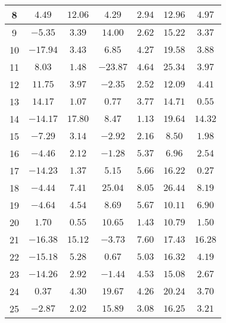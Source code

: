 \begin{table}[H]
\begin{tabular}{|c|c|c|c|c|c|c|}
                        8    &  $4.49$     &  $12.06$  &  $4.29$    &  $2.94$  &  $12.96$ &  $4.97$   \\ \hline
                        9    &  $-5.35$    &  $3.39$   &  $14.00$   &  $2.62$  &  $15.22$ &  $3.37$   \\ \hline
                        10   &  $-17.94$   &  $3.43$   &  $6.85$    &  $4.27$  &  $19.58$ &  $3.88$   \\ \hline
                        11   &  $8.03$     &  $1.48$   &  $-23.87$  &  $4.64$  &  $25.34$ &  $3.97$   \\ \hline
                        12   &  $11.75$    &  $3.97$   &  $-2.35$   &  $2.52$  &  $12.09$ &  $4.41$   \\ \hline
                        13   &  $14.17$    &  $1.07$   &  $0.77$    &  $3.77$  &  $14.71$ &  $0.55$   \\ \hline
                        14   &  $-14.17$   &  $17.80$  &  $8.47$    &  $1.13$  &  $19.64$ &  $14.32$  \\ \hline
                        15   &  $-7.29$    &  $3.14$   &  $-2.92$   &  $2.16$  &  $8.50$  &  $1.98$   \\ \hline
                        16   &  $-4.46$    &  $2.12$   &  $-1.28$   &  $5.37$  &  $6.96$  &  $2.54$   \\ \hline
                        17   &  $-14.23$   &  $1.37$   &  $5.15$    &  $5.66$  &  $16.22$ &  $0.27$   \\ \hline
                        18   &  $-4.44$    &  $7.41$   &  $25.04$   &  $8.05$  &  $26.44$ &  $8.19$   \\ \hline
                        19   &  $-4.64$    &  $4.54$   &  $8.69$    &  $5.67$  &  $10.11$ &  $6.90$   \\ \hline
                        20   &  $1.70$     &  $0.55$   &  $10.65$   &  $1.43$  &  $10.79$ &  $1.50$   \\ \hline
                        21   &  $-16.38$   &  $15.12$  &  $-3.73$   &  $7.60$  &  $17.43$ &  $16.28$  \\ \hline
                        22   &  $-15.18$   &  $5.28$   &  $0.67$    &  $5.03$  &  $16.32$ &  $4.19$   \\ \hline
                        23   &  $-14.26$   &  $2.92$   &  $-1.44$   &  $4.53$  &  $15.08$ &  $2.67$   \\ \hline
                        24   &  $0.37$     &  $4.30$   &  $19.67$   &  $4.26$  &  $20.24$ &  $3.70$   \\ \hline
                        25   &  $-2.87$    &  $2.02$   &  $15.89$   &  $3.08$  &  $16.25$ &  $3.21$   \\ \hline

\end{tabular}
\end{table}
